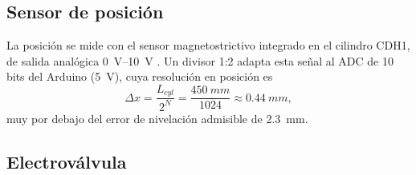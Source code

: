 \documentclass[conference]{IEEEtran}
\begin{document}
\subsection{Sensor de posición}
La posición se mide con el sensor magnetostrictivo integrado en el cilindro CDH1, de salida analógica \SIrange{0}{10}{V} \cite{rexroth}. Un divisor 1:2 adapta esta señal al ADC de 10 bits del Arduino (\SI{5}{V}), cuya resolución en posición es
\begin{equation}
\Delta x = \frac{L_{cyl}}{2^{N}} = \frac{\SI{450}{mm}}{1024} \approx \SI{0.44}{mm},
\label{eq:resolucion}
\end{equation}
muy por debajo del error de nivelación admisible de \SI{2.3}{mm}.

\subsection{Electroválvula}
\end{document}
